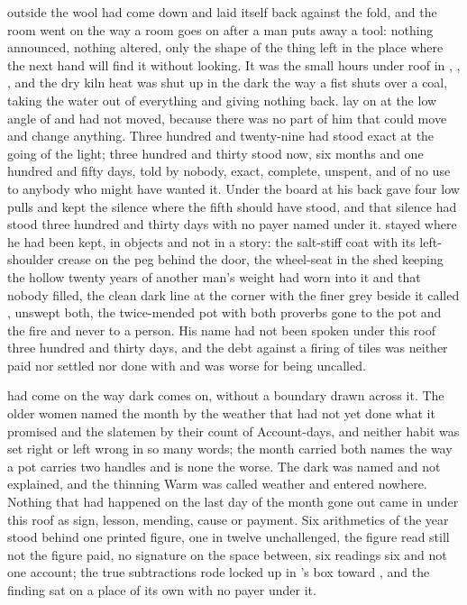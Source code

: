 
 outside the wool had come down and laid itself back against the fold, and the room went on the way a room goes on after a man puts away a tool: nothing announced, nothing altered, only the shape of the thing left in the place where the next hand will find it without looking. It was the small hours under  roof in , , , and the dry kiln heat was shut up in the dark the way a fist shuts over a coal, taking the water out of everything and giving nothing back.  lay on  at the low angle of  and had not moved, because there was no part of him that could move and change anything. Three hundred and twenty-nine had stood exact at the going of the light; three hundred and thirty stood now, six months and one hundred and fifty days, told by nobody, exact, complete, unspent, and of no use to anybody who might have wanted it. Under the board at his back  gave four low pulls and kept the silence where the fifth should have stood, and that silence had stood three hundred and thirty days with no payer named under it.  stayed where he had been kept, in objects and not in a story: the salt-stiff coat with its left-shoulder crease on the peg behind the door, the wheel-seat in the shed keeping the hollow twenty years of another man's weight had worn into it and that nobody filled, the clean dark line at the corner with the finer grey beside it called , unswept both, the twice-mended pot with both proverbs gone to the pot and the fire and never to a person. His name had not been spoken under this roof three hundred and thirty days, and the debt against a firing of tiles was neither paid nor settled nor done with and was worse for being uncalled.

 had come on the way dark comes on, without a boundary drawn across it. The older women named the month by the weather that had not yet done what it promised and the slatemen by their count of Account-days, and neither habit was set right or left wrong in so many words; the month carried both names the way a pot carries two handles and is none the worse. The dark was named and not explained, and the thinning Warm was called weather and entered nowhere. Nothing that had happened on the last day of the month gone out came in under this roof as sign, lesson, mending, cause or payment. Six arithmetics of the year stood behind one printed figure, one in twelve unchallenged, the figure read still not the figure paid, no signature on the space between, six readings six and not one account; the true subtractions rode locked up  in 's box toward , and the finding sat on a place of its own with no payer under it.

